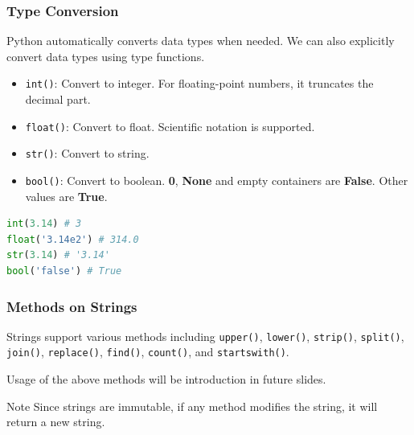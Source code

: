 \documentclass[beamer, en, version=2.0]{huangfusl-template}
\begin{document}
    \begin{frame}[fragile]
        \frametitle{Type Conversion}

        Python automatically converts data types when needed. We can also explicitly convert data types using type functions.

        \begin{itemize}
            \item {\footnotesize\verb|int()|}: Convert to integer. For floating-point numbers, it truncates the decimal part.
            \item {\footnotesize\verb|float()|}: Convert to float. Scientific notation is supported.
            \item {\footnotesize\verb|str()|}: Convert to string.
            \item {\footnotesize\verb|bool()|}: Convert to boolean. \textbf{0}, \textbf{None} and empty containers are \textbf{False}. Other values are \textbf{True}.
        \end{itemize}
\begin{lstlisting}[language=python]
int(3.14) # 3
float('3.14e2') # 314.0
str(3.14) # '3.14'
bool('false') # True
\end{lstlisting}
    \end{frame}
    \begin{frame}[fragile]
        \frametitle{Methods on Strings}

        Strings support various methods including {\footnotesize\verb|upper()|}, {\footnotesize\verb|lower()|}, {\footnotesize\verb|strip()|}, {\footnotesize\verb|split()|}, {\footnotesize\verb|join()|}, {\footnotesize\verb|replace()|}, {\footnotesize\verb|find()|}, {\footnotesize\verb|count()|}, and {\footnotesize\verb|startswith()|}.

        Usage of the above methods will be introduction in future slides.

        \begin{block}{Note}
            Since strings are immutable, if any method modifies the string, it will return a new string.
        \end{block}
    \end{frame}
\end{document}
